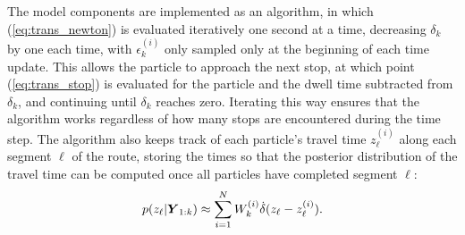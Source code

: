 The model components are implemented as an algorithm,
in which (\ref{eq:trans_newton}) is evaluated iteratively
one second at a time, decreasing $\delta_k$ by one each time,
with $\epsilon_k^{(i)}$ only sampled only at the beginning
of each time update.
This allows the particle to approach the next stop,
at which point (\ref{eq:trans_stop}) is evaluated for the particle
and the dwell time subtracted from $\delta_k$,
and continuing until $\delta_k$ reaches zero.
Iterating this way ensures that 
the algorithm works regardless of how many
stops are encountered during the time step.
The algorithm also keeps track of each particle's travel time $z_\ell^{(i)}$
along each segment $\ell$ of the route,
storing the times so that the posterior distribution of the travel time
can be computed once all particles have completed segment $\ell$:
\begin{equation}
\label{eq:post_tt}
p(z_\ell | \mbox{$\boldsymbol{Y}$}_{1:k}) \approx
    \sum_{i=1}^N W_k^{(i)} \dot\delta(z_\ell - z_\ell^{(i)}).
\end{equation}




